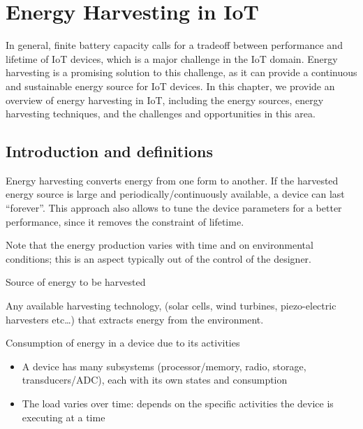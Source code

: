 \chapter{Energy Harvesting in IoT}
In general, finite battery capacity calls for a tradeoff between performance and lifetime of IoT devices, which is a major challenge in the IoT domain. Energy harvesting is a promising solution to this challenge, as it can provide a continuous and sustainable energy source for IoT devices. In this chapter, we provide an overview of energy harvesting in IoT, including the energy sources, energy harvesting techniques, and the challenges and opportunities in this area.

\section{Introduction and definitions}
Energy harvesting converts energy from one form to another.
If the harvested energy source
is large and periodically/continuously available, a device can last ``forever''.
This approach also allows to tune the device parameters for a better performance, since it removes the constraint of lifetime.

Note that the energy production varies with time and on environmental conditions; 
this is an aspect typically out of the control of the designer.

\begin{definition}
   {\ns Source of energy to be harvested
   }
\end{definition}

\begin{definition}
   Any available harvesting technology, (solar cells, wind turbines, piezo-electric harvesters etc\dots) that extracts energy from the environment.
\end{definition}

\begin{definition}
   [Load]
   Consumption of energy in a device due to its activities
   \begin{itemize}
      \item A device has many subsystems
      (processor/memory, radio, storage,
      transducers/ADC), each with its own states and
      consumption
      \item The load varies over time:
      depends on the specific activities the device is
      executing at a time
   \end{itemize}
\end{definition}

